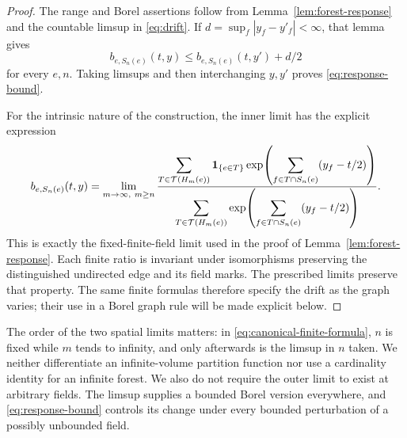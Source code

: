 \begin{proof}
The range and Borel assertions follow from
Lemma~\ref{lem:forest-response} and the countable limsup in
\eqref{eq:drift}.  If $d=\sup_f|y_f-y'_f|<\infty$, that lemma gives
\[
 b_{e,S_n(e)}(t,y)
 \le b_{e,S_n(e)}(t,y')+d/2
\]
for every $e,n$.  Taking limsups and then interchanging $y,y'$ proves
\eqref{eq:response-bound}.

For the intrinsic nature of the construction, the inner limit has the
explicit expression
\begin{equation}
\label{eq:canonical-finite-formula}
 b_{e,S_n(e)}(t,y)
 =\lim_{m\to\infty,\ m\ge n}
 \frac{\displaystyle
  \sum_{T\in\mathcal T(H_m(e))}
   \mathbf 1_{\{e\in T\}}
   \exp\!\left(\sum_{f\in T\cap S_n(e)}(y_f-t/2)\right)}
 {\displaystyle
  \sum_{T\in\mathcal T(H_m(e))}
   \exp\!\left(\sum_{f\in T\cap S_n(e)}(y_f-t/2)\right)}.
\end{equation}
This is exactly the fixed-finite-field limit used in the proof of
Lemma~\ref{lem:forest-response}.  Each finite ratio is invariant under
isomorphisms preserving the distinguished undirected edge and its
field marks.  The prescribed limits preserve that property.  The same
finite formulas therefore specify the drift as the graph varies;
their use in a Borel graph rule will be made explicit below.
\end{proof}

The order of the two spatial limits matters: in
\eqref{eq:canonical-finite-formula}, $n$ is fixed while $m$ tends to
infinity, and only afterwards is the limsup in $n$ taken.  We neither
differentiate an infinite-volume partition function nor use a
cardinality identity for an infinite forest.  We also do not require
the outer limit to exist at arbitrary fields.  The limsup supplies a
bounded Borel version everywhere, and
\eqref{eq:response-bound} controls its change under every bounded
perturbation of a possibly unbounded field.
